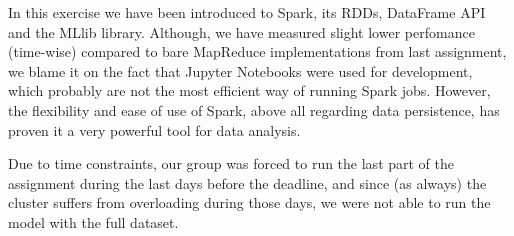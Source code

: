 \documentclass[11pt]{article}
\begin{document}
In this exercise we have been introduced to Spark, its RDDs, DataFrame API and the MLlib library. Although, we have measured slight lower perfomance (time-wise) compared to bare MapReduce implementations from last assignment, we blame it on the fact that Jupyter Notebooks were used for development, which probably are not the most efficient way of running Spark jobs. However, the flexibility and ease of use of Spark, above all regarding data persistence, has proven it a very powerful tool for data analysis.

Due to time constraints, our group was forced to run the last part of the assignment during the last days before the deadline, and since (as always) the cluster suffers from overloading during those days, we were not able to run the model with the full dataset.



\label{LastMainPage}
\end{document}
